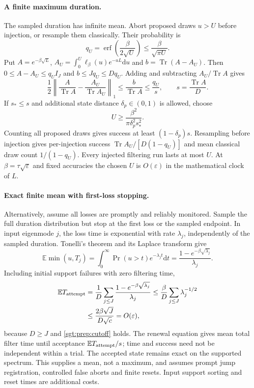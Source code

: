 \documentclass[aps,pra,reprint,superscriptaddress,longbibliography]{revtex4-2}
\newcommand{\Tr}{\operatorname{Tr}}
\newcommand{\dd}{\mathrm d}
\begin{document}
\paragraph{A finite maximum duration.}
The sampled duration has infinite mean. Abort proposed draws $u>U$
before injection, or resample them classically. Their probability is
\begin{equation}
 q_U=\operatorname{erf}\!\left(\frac{\beta}{2\sqrt U}\right)
 \le\frac{\beta}{\sqrt{\pi U}}.
 \label{sgt:prep:duration-tail}
\end{equation}
Put $A=e^{-\beta\sqrt L}$,
$A_U=\int_0^U\ell_\beta(u)e^{-uL}\dd u$ and
$b=\Tr(A-A_U)$. Then $0\le A-A_U\le q_UI_J$ and
$b\le Jq_U\le Dq_U$. Adding and subtracting $A_U/\Tr A$ gives
\begin{equation}
 \frac12\left\|\frac A{\Tr A}-\frac{A_U}{\Tr A_U}\right\|_1
 \le\frac b{\Tr A}\le\frac{q_U}s,
 \qquad s=\frac{\Tr A}D.
 \label{sgt:prep:duration-bias}
\end{equation}
If $s_*\le s$ and additional state distance $\delta_p\in(0,1)$
is allowed, choose
\begin{equation}
 U\ge\frac{\beta^2}{\pi\delta_p^2s_*^2}.
 \label{sgt:prep:duration-cutoff}
\end{equation}
Counting all proposed draws gives success at least $(1-\delta_p)s$.
Resampling before injection gives per-injection success
$\Tr A_U/[D(1-q_U)]$ and mean classical draw count $1/(1-q_U)$.
Every injected filtering run lasts at most $U$. At
$\beta=\tau\sqrt\varepsilon$ and fixed accuracies the chosen $U$
is $O(\varepsilon)$ in the mathematical clock of $L$.

\paragraph{Exact finite mean with first-loss stopping.}
Alternatively, assume all losses are promptly and reliably monitored.
Sample the full duration distribution but stop at the first loss or
the sampled endpoint. In input eigenmode $j$, the loss time is
exponential with rate $\lambda_j$, independently of the sampled
duration. Tonelli's theorem and its Laplace transform give
\[
 \mathbb E\min(u,T_j)
 =\int_0^\infty\Pr(u>t)e^{-\lambda_jt}\dd t
 =\frac{1-e^{-\beta\sqrt{\lambda_j}}}{\lambda_j}.
\]
Including initial support failures with zero filtering time,
\begin{align}
 \mathbb ET_{\rm attempt}
 &=\frac1D\sum_{j\le J}
     \frac{1-e^{-\beta\sqrt{\lambda_j}}}{\lambda_j}
 \le\frac{\beta}{D}\sum_{j\le J}\lambda_j^{-1/2}\notag\\
 &\le\frac{2\beta\sqrt J}{D\sqrt c}=O(\varepsilon),
 \label{sgt:prep:first-loss}
\end{align}
because $D\ge J$ and \eqref{sgt:prep:cutoff} holds.
The renewal equation gives mean total filter time until acceptance
$\mathbb ET_{\rm attempt}/s$; time and success need not be independent
within a trial. The accepted state remains exact on the supported
spectrum. This supplies a mean, not a maximum, and assumes prompt
jump registration, controlled false aborts and finite resets. Input
support sorting and reset times are additional costs.
\end{document}

